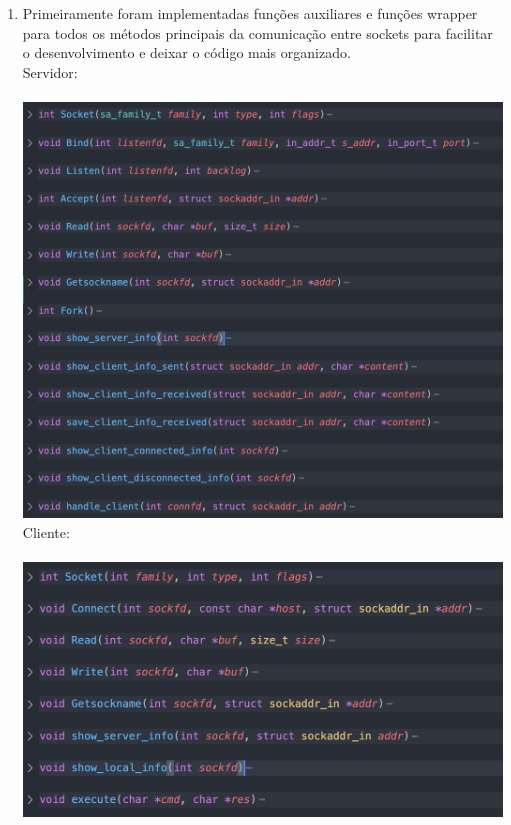 \documentclass[12pt,a4paper]{report}
\begin{document}
\begin{enumerate}
    \item Primeiramente foram implementadas funções auxiliares e funções wrapper para todos os métodos principais da comunicação entre sockets para facilitar o desenvolvimento e deixar o código mais organizado. 
    \\
    Servidor:\\\\
    \includegraphics[width=13cm]{images/ex2-servidor-funcoes.png}\\
    Cliente:\\\\
    \includegraphics[width=13cm]{images/ex2-cliente-funcoes.png}
    

\end{enumerate}
\end{document}
